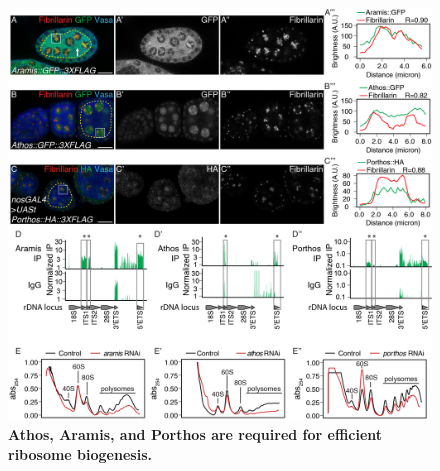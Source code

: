 \documentclass[12pt,oneside]{reedthesis}
\begin{document}
\begin{figure}

{\centering \includegraphics[width=6.5 in,height=8.9375 in]{./figure/Ribosome Biogenesis/Ribosome Biogenesis 2} 

}

\caption[\textbf{Athos, Aramis, and Porthos are required for efficient ribosome biogenesis.}]{\textbf{Athos, Aramis, and Porthos are required for efficient ribosome biogenesis.}}\label{fig:unnamed-chunk-8}
\end{figure}
\end{document}
